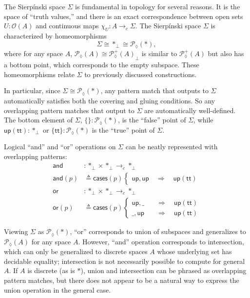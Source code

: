 \documentclass[conference]{IEEEtran}
\newcommand{\PLower}{\mathcal{P}_\lozenge}
\newcommand{\cto}{\to_c}
\newcommand{\One}{\ast}
\newcommand{\Open}[1]{\mathcal{O}({#1})}
\newcommand{\wildcard}{\_}
\newcommand{\Branch}{\Rightarrow}
\newcommand{\up}{\mathsf{up}}
\begin{document}
The Sierp\'inski space $\Sigma$ is fundamental in topology for several reasons. It is the space of ``truth values,'' and there is an exact correspondence between open sets $U : \Open{A}$ and continuous maps $\chi_U : A \cto \Sigma$. The Sierp\'inski space $\Sigma$ is characterized by homeomorphisms
\[
\Sigma \cong \One_\bot \cong \PLower(\One) ,
\]
where for any space $A$, $\PLower(A) \cong {\PLower^+(A)}_\bot$ is similar to $\PLower^+(A)$ but also has a bottom point, which corresponds to the empty subspace. These homeomorphisms relate $\Sigma$ to previously discussed constructions.

In particular, since $\Sigma \cong \PLower(\One)$, any pattern match that outputs to $\Sigma$ automatically satisfies both the covering and gluing conditions. So any overlapping pattern matches that output to $\Sigma$ are automatically well-defined. The bottom element of $\Sigma$, $\{ \} : \PLower(\One)$, is the ``false'' point of $\Sigma$, while $\up(\mathsf{tt}) : \One_\bot$ or $\{ \mathsf{tt} \} : \PLower(\One)$ is the ``true'' point of $\Sigma$.

Logical ``and'' and ``or'' operations on $\Sigma$ can be neatly represented with overlapping patterns:
\begin{align*}
\mathsf{and} &: \One_\bot \times \One_\bot \cto \One_\bot
\\ \mathsf{and}(p) &\triangleq \mathsf{cases}(p)
\begin{cases}
\up , \up
  \quad \Branch \quad \up(\mathsf{tt})
\end{cases}
\\
\mathsf{or} &: \One_\bot \times \One_\bot \cto \One_\bot
\\ \mathsf{or}(p) &\triangleq \mathsf{cases}(p)
\begin{cases}
\up , \wildcard
  \quad &\Branch \quad \up(\mathsf{tt})
\\  \wildcard , \up
  \quad &\Branch \quad \up(\mathsf{tt})
\end{cases}
\end{align*}

Viewing $\Sigma$ as $\PLower(\One)$, ``or'' corresponds to union of subspaces and generalizes to $\PLower(A)$ for any space $A$. However, ``and'' operation corresponds to intersection, which can only be generalized to discrete spaces $A$ whose underlying set has decidable equality; intersection is not necessarily possible to compute for general $A$. If $A$ is discrete (as is $\One$), union and intersection can be phrased as overlapping pattern matches, but there does not appear to be a natural way to express the union operation in the general case.
\end{document}
